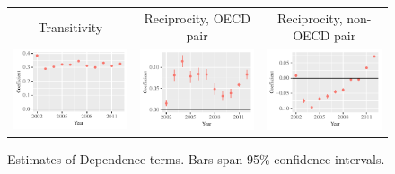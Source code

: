 \documentclass[reqno,onecolumn,letterpaper,12pt]{article}
\begin{document}
{\begin{figure}[!h]
\centering
\begin{tabular}{@{\hskip -.05cm}c@{\hskip .1cm}c@{\hskip .1cm}c}
Transitivity  & Reciprocity, OECD pair &Reciprocity, non-OECD pair\\
\includegraphics[height=.16\textheight, clip=true, trim=.55cm .6cm .25cm .1cm]{SI_figures/EU_rl_plots/Transitivity.pdf}   &
\includegraphics[height=.16\textheight, clip=true, trim=.55cm .6cm .25cm .1cm]{SI_figures/EU_rl_plots/Mutuality_OECD.pdf}    &
\includegraphics[height=.16\textheight, clip=true, trim=.55cm .6cm .25cm .1cm]{SI_figures/EU_rl_plots/Mutuality_notOECD.pdf} \\
\end{tabular}
\caption{\label{fig:EU_netterms} Estimates of Dependence terms. Bars span 95\% confidence intervals. }
\end{figure}

}
\end{document}

